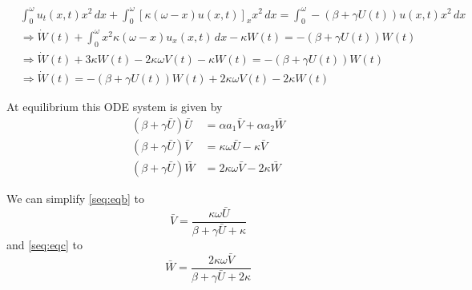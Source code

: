 \documentclass{article}
\begin{document}
\begin{subequations}
  \begin{align}
    &\int_0^{\omega} u_t(x,t)x^2\,dx + \int_0^{\omega} [\kappa(\omega-x)u(x,t)]_x x^2 \, dx = \int_0^{\omega} -(\beta+\gamma U(t)) u(x,t)x^2\, dx\\
    &\Rightarrow \dot{W}(t) + \int_0^{\omega} x^2\kappa(\omega-x)u_x(x,t)\,dx - \kappa W(t) = -(\beta+\gamma U(t)) W(t)\\%
    &\Rightarrow\dot{W}(t) + 3\kappa W(t) - 2\kappa \omega V(t) - \kappa W(t) = -(\beta+\gamma U(t)) W(t)\\
    &\Rightarrow \dot{W}(t) = -(\beta+\gamma U(t)) W(t) + 2\kappa \omega V(t) - 2\kappa W(t)
  \end{align}
\end{subequations}

At equilibrium this ODE system is given by
\begin{subequations}
  \label{eq:eq}
  \begin{align}
  (\beta+\gamma \bar{U}) \bar{U} &= \alpha a_1 \bar{V} + \alpha a_2 \bar{W}\label{seq:eqa}\\
  (\beta + \gamma \bar{U})\bar{V}  &=  \kappa \omega \bar{U} - \kappa \bar{V}\label{seq:eqb}\\
  (\beta+\gamma \bar{U})\bar{W}  &=  2\kappa\omega \bar{V} - 2\kappa \bar{W}\label{seq:eqc}
  \end{align}
\end{subequations}

We can simplify \ref{seq:eqb} to
\begin{equation}
  \bar{V} = \frac{\kappa \omega \bar{U} }{\beta + \gamma \bar{U} + \kappa}\label{eq:6}
\end{equation}
and \ref{seq:eqc} to 
\begin{equation}
  \bar{W} = \frac{2\kappa\omega\bar{V}}{\beta + \gamma\bar{U} + 2\kappa}\label{eq:7}
\end{equation}
\end{document}
